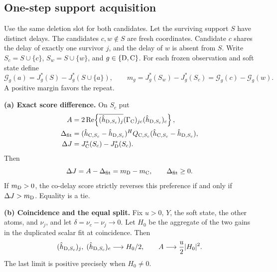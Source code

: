 \subsection{One-step support acquisition}

\begin{afdmprop}
\label{prop:af-split}
Use the same deletion slot for both candidates. Let the surviving
support $S$ have distinct delays. The candidates $c,w\notin S$ are
fresh coordinates. Candidate $c$ shares the delay of exactly one
survivor $j$, and the delay of $w$ is absent from $S$. Write
$S_c=S\cup\{c\}$, $S_w=S\cup\{w\}$, and $g\in\{{\rm D},{\rm C}\}$.
For each frozen observation and soft state define
\[
 \mathcal G_g(a)=J_g^*(S)-J_g^*(S\cup\{a\}),\qquad
 m_g=J_g^*(S_w)-J_g^*(S_c)=\mathcal G_g(c)-\mathcal G_g(w).
\]
A positive margin favors the repeat.

\medskip\noindent
\textup{\textbf{(a) Exact score difference.}}
On $S_c$ put
\begin{align*}
 A&=2\operatorname{Re}\!
   \left\{\overline{(\hat h_{{\rm D},S_c})_j}
         (\Gamma_{\rm C})_{jc}(\hat h_{{\rm D},S_c})_c\right\},\\
 \Delta_{\rm fit}
   &=(\hat h_{{\rm C},S_c}-\hat h_{{\rm D},S_c})^H Q_{{\rm C},S_c}
                       (\hat h_{{\rm C},S_c}-\hat h_{{\rm D},S_c}),\\
 \Delta J&=J_{\rm C}^*(S_c)-J_{\rm D}^*(S_c).
\end{align*}
Then
\begin{equation}
 \Delta J=A-\Delta_{\rm fit}=m_{\rm D}-m_{\rm C},
 \qquad \Delta_{\rm fit}\ge0.                              \label{eq:af-score}
\end{equation}
If $m_{\rm D}>0$, the co-delay score strictly reverses this preference
if and only if $\Delta J>m_{\rm D}$. Equality is a tie.

\medskip\noindent
\textup{\textbf{(b) Coincidence and the equal split.}}
Fix $u>0$, $Y$, the soft state, the other atoms, and $\nu_j$, and
let $\delta=\nu_c-\nu_j\to0$. Let $H_0$ be the aggregate of the two
gains in the duplicated scalar fit at coincidence. Then
\begin{equation}
 (\hat h_{{\rm D},S_c})_j,\;(\hat h_{{\rm D},S_c})_c
       \longrightarrow H_0/2,\qquad
 A\longrightarrow \frac u2|H_0|^2 .                      \label{eq:af-A-limit}
\end{equation}
The last limit is positive precisely when $H_0\ne0$.


\end{afdmprop}
